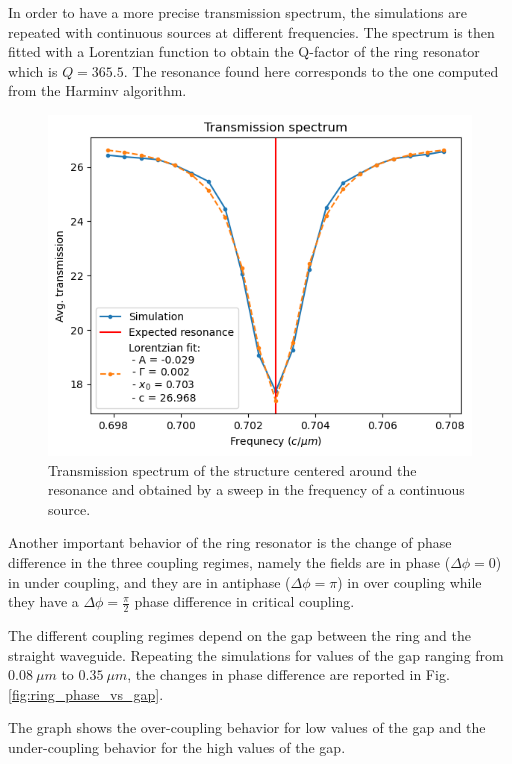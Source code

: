 In order to have a more precise transmission spectrum, the simulations are repeated with continuous sources at different frequencies. The spectrum is then fitted with a Lorentzian function to obtain the Q-factor of the ring resonator which is \(Q=365.5\). The resonance found here corresponds to the one computed from the Harminv algorithm.

\begin{figure}[H]
    \centering
    \includegraphics[width=0.7\linewidth]{Figures/ring_frequency_sweep.png}
    \caption{Transmission spectrum of the structure centered around the resonance and obtained by a sweep in the frequency of a continuous source.}
    \label{fig:ring_frequency_sweep}
\end{figure}

Another important behavior of the ring resonator is the change of phase difference in the three coupling regimes, namely the fields are in phase (\(\Delta \phi = 0\)) in under coupling, and they are in antiphase (\(\Delta \phi = \pi\)) in over coupling while they have a \(\Delta \phi = \frac{\pi}{2}\) phase difference in critical coupling.

The different coupling regimes depend on the gap between the ring and the straight waveguide. Repeating the simulations for values of the gap ranging from \(0.08\ \mu m\) to \(0.35\ \mu m\), the changes in phase difference are reported in Fig. \ref{fig:ring_phase_vs_gap}. 

The graph shows the over-coupling behavior for low values of the gap and the under-coupling behavior for the high values of the gap.

